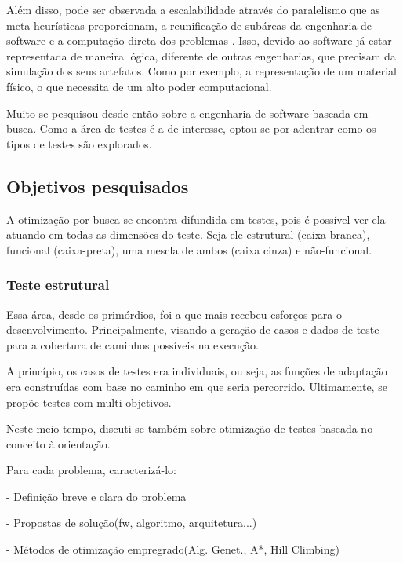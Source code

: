 Além disso, pode ser observada a escalabilidade através do paralelismo que as
meta-heurísticas proporcionam, a reunificação de subáreas da engenharia de
software e a computação direta dos problemas \cite{harman2012search}. Isso,
devido ao software já estar representada de maneira lógica, diferente de outras
engenharias, que precisam da simulação dos seus artefatos. Como por exemplo, a
representação de um material físico, o que necessita de um alto poder
computacional.

Muito se pesquisou desde então sobre a engenharia de software baseada em busca.
Como a área de testes é a de interesse, optou-se por adentrar como os tipos de
testes são explorados.

\subsection{Objetivos pesquisados}

A otimização por busca se encontra difundida em testes, pois é possível ver ela
atuando em todas as dimensões do teste. Seja ele estrutural (caixa branca),
funcional (caixa-preta), uma mescla de ambos (caixa cinza) e não-funcional.

\subsubsection{Teste estrutural}

Essa área, desde os primórdios, foi a que mais recebeu esforços para o
desenvolvimento. Principalmente, visando a geração de casos e dados de teste
para a cobertura de caminhos possíveis na execução. 

A princípio, os casos de testes era individuais, ou seja, as funções de
adaptação era construídas com base no caminho em que seria percorrido.
Ultimamente, se propõe testes com multi-objetivos. 

Neste meio tempo, discuti-se também sobre otimização de testes baseada no
conceito à orientação. 


Para cada problema, caracterizá-lo:

- Definição breve e clara do problema

- Propostas de solução(fw, algoritmo, arquitetura...)

- Métodos de otimização empregrado(Alg. Genet., A*, Hill Climbing)


